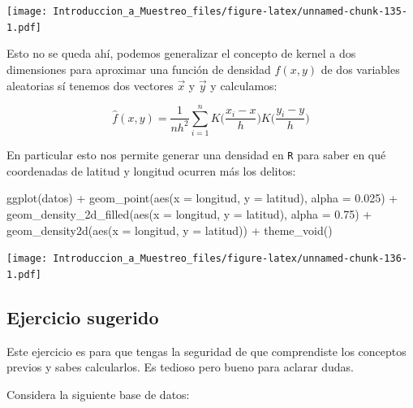 \documentclass[
]{book}
\newenvironment{Shaded}{\begin{snugshade}}{\end{snugshade}}
\newcommand{\AttributeTok}[1]{\textcolor[rgb]{0.77,0.63,0.00}{#1}}
\newcommand{\FloatTok}[1]{\textcolor[rgb]{0.00,0.00,0.81}{#1}}
\newcommand{\FunctionTok}[1]{\textcolor[rgb]{0.00,0.00,0.00}{#1}}
\newcommand{\NormalTok}[1]{#1}
\newcommand{\SpecialCharTok}[1]{\textcolor[rgb]{0.00,0.00,0.00}{#1}}
\begin{document}
\texttt{[image: Introduccion\_a\_Muestreo\_files/figure-latex/unnamed-chunk-135-1.pdf]}

Esto no se queda ahí, podemos generalizar el concepto de kernel a dos dimensiones para aproximar una función de densidad \(f(x,y)\) de dos variables aleatorias sí tenemos dos vectores \(\vec{x}\) y \(\vec{y}\) y calculamos:

\[
\hat{f}(x,y) =\dfrac{1}{nh^2} \sum\limits_{i = 1}^n K \Big( \frac{x_i - x}{h}\Big) K \Big( \frac{y_i - y}{h}\Big)
\]

En particular esto nos permite generar una densidad en \texttt{R} para saber en qué coordenadas de latitud y longitud ocurren más los delitos:

\begin{Shaded}
\begin{Highlighting}[]
\FunctionTok{ggplot}\NormalTok{(datos) }\SpecialCharTok{+}
  \FunctionTok{geom\_point}\NormalTok{(}\FunctionTok{aes}\NormalTok{(}\AttributeTok{x =}\NormalTok{ longitud, }\AttributeTok{y =}\NormalTok{ latitud), }\AttributeTok{alpha =} \FloatTok{0.025}\NormalTok{) }\SpecialCharTok{+}
  \FunctionTok{geom\_density\_2d\_filled}\NormalTok{(}\FunctionTok{aes}\NormalTok{(}\AttributeTok{x =}\NormalTok{ longitud, }\AttributeTok{y =}\NormalTok{ latitud), }\AttributeTok{alpha =} \FloatTok{0.75}\NormalTok{) }\SpecialCharTok{+}
  \FunctionTok{geom\_density2d}\NormalTok{(}\FunctionTok{aes}\NormalTok{(}\AttributeTok{x =}\NormalTok{ longitud, }\AttributeTok{y =}\NormalTok{ latitud)) }\SpecialCharTok{+}
  \FunctionTok{theme\_void}\NormalTok{()}
\end{Highlighting}
\end{Shaded}

\texttt{[image: Introduccion\_a\_Muestreo\_files/figure-latex/unnamed-chunk-136-1.pdf]}

\hypertarget{ejercicio-sugerido}{%
\subsection{Ejercicio sugerido}\label{ejercicio-sugerido}}

Este ejercicio es para que tengas la seguridad de que comprendiste los conceptos previos y sabes calcularlos. Es tedioso pero bueno para aclarar dudas.

Considera la siguiente base de datos:
\end{document}
